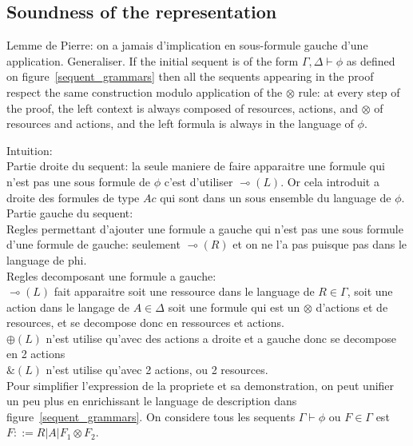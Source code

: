 \documentclass[runningheads,a4paper]{llncs}
\begin{document}
\subsection{Soundness of the representation}
Lemme de Pierre: on a jamais d'implication en sous-formule gauche d'une application. Generaliser.
If the initial sequent is of the form $\Gamma , \Delta \vdash \phi$ as defined on figure~\ref{sequent_grammars} then all the sequents appearing in the proof respect the same construction modulo application of the $\otimes$ rule: at every step of the proof, the left context is always composed of resources, actions, and $\otimes$ of resources and actions, and the left formula is always in the language of $\phi$.

Intuition:\\
Partie droite du sequent: la seule maniere de faire apparaitre une formule qui n'est pas une sous formule de $\phi$ c'est d'utiliser $\multimap(L)$. Or cela introduit a droite des formules de type $Ac$ qui sont dans un sous ensemble du language de $\phi$.\\
Partie gauche du sequent:\\
Regles permettant d'ajouter une formule a gauche qui n'est pas une sous formule d'une formule de gauche: seulement  $\multimap(R)$ et on ne l'a pas puisque pas dans le language de phi.\\
Regles decomposant une formule a gauche:\\
$\multimap(L)$ fait apparaitre soit une ressource dans le language de $R \in \Gamma$, soit une action dans le langage de $A\in\Delta$ soit une formule qui est un $\otimes$ d'actions et de resources, et se decompose donc en ressources et actions.\\
$\oplus(L)$ n'est utilise qu'avec des actions a droite et a gauche donc se decompose en 2 actions\\
$\&(L)$ n'est utilise qu'avec 2 actions, ou 2 resources.\\

Pour simplifier l'expression de la propriete et sa demonstration, on peut unifier un peu plus en enrichissant le language de description dans figure~\ref{sequent_grammars}. On considere tous les sequents $\Gamma \vdash \phi$ ou $F\in\Gamma$ est $F::= R|A| F_{1}\otimes F_{2}$.
\end{document}
